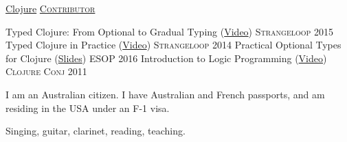 \documentclass[10pt,a4paper]{article}
\begin{document}
\headedsection
  {\href{https://github.com/clojure/clojure}{Clojure}}
  {\href{https://github.com/clojure/clojure/commits?author=frenchy64}{\textsc{Contributor}}} {%
    {
    }
}


\headedsection
  {Typed Clojure: From Optional to Gradual Typing (\href{https://www.youtube.com/watch?v=yG9CffLlXx0}{Video})}
  {\textsc{Strangeloop 2015}} {%
}
\headedsection
  {Typed Clojure in Practice (\href{https://www.youtube.com/watch?v=a0gT0syAXsY}{Video})}
  {\textsc{Strangeloop 2014}} {%
}
\headedsection
  {Practical Optional Types for Clojure (\href{http://ambrosebs.com/talks/esop16.pdf}{Slides})}
  {\textsc{ESOP 2016}} {%
  }
\headedsection
  {Introduction to Logic Programming (\href{https://www.youtube.com/watch?v=irjP8BO1B8Y}{Video})}
  {\textsc{Clojure Conj 2011}} {%
}


{\bodytext
  {I am an Australian citizen. I have Australian and French
   passports, and am residing in the USA under an F-1 visa.}
}

{\bodytext
  {Singing, guitar, clarinet, reading, teaching.}
}
\end{document}
